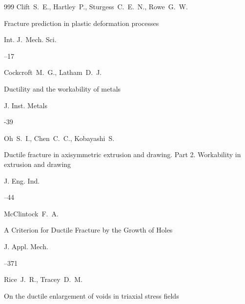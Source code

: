 \begin{thebibliography}{999}
\by Clift~S.~E., Hartley~P., Sturgess~C.~E.~N., Rowe~G.~W. 

\paper Fracture prediction in plastic deformation processes

\jour Int. J.~Mech. Sci.




–17





\by Cockcroft~M.~G., Latham~D.~J. 

\paper Ductility and the workability of metals

\jour J. Inst. Metals



-39




\by Oh~S.~I., Chen~C.~C., Kobayashi~S. 

\paper Ductile fracture in axisymmetric extrusion and drawing. Part 2. Workability in extrusion and drawing

\jour J. Eng. Ind. 




–44






\by McClintock~F.~A. 

\paper A Criterion for Ductile Fracture by the Growth of Holes

\jour J. Appl. Mech.  




--371





\by Rice~J.~R., Tracey~D.~M.

\paper On the ductile enlargement of voids in triaxial stress fields


\end{thebibliography}
